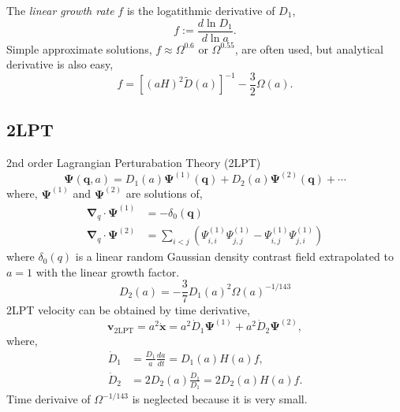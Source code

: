 \documentclass[a4paper]{article}
\begin{document}
%
The \textit{linear growth rate} $f$ is the logatithmic derivative of $D_1$,
\begin{equation}
  f := \frac{d\ln D_1}{d\ln a}.
\end{equation}
Simple approximate solutions, $f \approx \Omega^{0.6}$ or
$\Omega^{0.55}$, are often used, but analytical derivative is also easy,
\begin{equation}
  f = \left[ (aH)^2 \tilde{D}(a) \right]^{-1} - \frac{3}{2} \Omega(a).
\end{equation}

\subsection{2LPT}
2nd order Lagrangian Perturabation Theory (2LPT)
\begin{equation}
  \bm{\Psi}(\bm{q}, a) =
    D_1(a) \bm{\Psi}^{(1)}(\bm{q}) + D_2(a) \bm{\Psi}^{(2)}(\bm{q}) + \cdots
\end{equation}
where, $\bm{\Psi}^{(1)}$ and $\bm{\Psi}^{(2)}$ are solutions of,
\begin{align}
  \bm{\nabla}_q \cdot \bm{\Psi}^{(1)} &= - \delta_0(\bm{q})\\
  \bm{\nabla}_q \cdot \bm{\Psi}^{(2)} &= \sum_{i < j}
    \left( \Psi^{(1)}_{i,i} \Psi^{(1)}_{j,j} - \Psi^{(1)}_{i,j} \Psi^{(1)}_{j,i}
    \right)
\end{align}
where $\delta_0(q)$ is a linear random Gaussian density contrast field
extrapolated to $a=1$ with the linear growth factor.
\begin{equation}
  D_2(a) = -\frac{3}{7} D_1(a)^2 \Omega(a)^{-1/143}
\end{equation}
%
2LPT velocity can be obtained by time derivative,
%
\begin{equation}
  \bm{v}_\mathrm{2LPT} = a^2 \dot{\bm{x}} =
    a^2 \dot{D}_1 \bm{\Psi}^{(1)} + a^2 \dot{D}_2 \bm{\Psi}^{(2)},
\end{equation}
where,
\begin{align}
  \dot{D}_1 &= \frac{D_1}{a}\frac{da}{dt} = D_1(a) H(a) f,\\
  \dot{D}_2 &= 2 D_2(a) \frac{\dot{D}_1}{D_1} = 2 D_2(a) H(a) f.
\end{align}
Time derivaive of $\Omega^{-1/143}$ is neglected because it is very
small.\\
\end{document}
